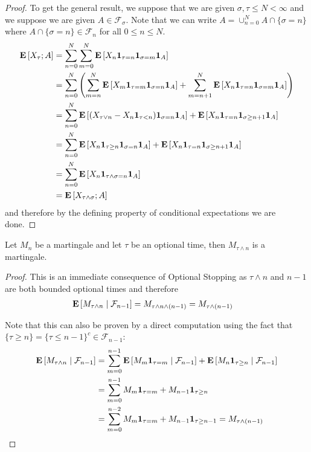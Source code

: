 \begin{proof}
To get the general result, we suppose that we are given $\sigma, \tau
\leq N < \infty$
and we suppose we are given $A \in \mathcal{F}_\sigma$.  Note that we
can write $A = \cup_{n=0}^N A \cap \lbrace \sigma=n\rbrace$ where
$A \cap \lbrace \sigma=n\rbrace \in \mathcal{F}_n$ for all $0 \leq n
\leq N$.
\begin{align*}
\expectation{X_\tau ; A} &= \sum_{n=0}^N \sum_{m=0}^N \expectation{X_n
  \characteristic{\tau=n} \characteristic{\sigma=m}
  \characteristic{A}} \\
&= \sum_{n=0}^N \left (
\sum_{m=n}^N \expectation{X_m
  \characteristic{\tau=m} \characteristic{\sigma=n} \characteristic{A}}+
\sum_{m=n+1}^N \expectation{X_n
  \characteristic{\tau=n} \characteristic{\sigma=m}\characteristic{A}}
\right) \\
&=\sum_{n=0}^N \expectation{(X_{\tau \vee n} - X_n
  \characteristic{\tau < n})\characteristic{\sigma=n}
  \characteristic{A}} + 
\expectation{X_n
  \characteristic{\tau=n} \characteristic{\sigma \geq
    n+1}\characteristic{A}} \\
&=\sum_{n=0}^N \expectation{X_n  \characteristic{\tau\geq n}\characteristic{\sigma=n}
  \characteristic{A}} + 
\expectation{X_n
  \characteristic{\tau=n} \characteristic{\sigma \geq
    n+1}\characteristic{A}} \\
&=\sum_{n=0}^N \expectation{X_n \characteristic{\tau \wedge \sigma =
    n}  \characteristic{A}} \\
&= \expectation{X_{\tau \wedge \sigma} ; A}
\end{align*}
and therefore by the defining property of conditional expectations we
are done.
\end{proof}

\begin{cor}Let $M_n$ be a martingale and let $\tau$ be an optional
  time, then $M_{\tau \wedge n}$ is a martingale.
\end{cor}
\begin{proof}
This is an immediate consequence of Optional Stopping as $\tau \wedge
n$ and $n-1$ are both bounded optional times and therefore 
\begin{align*}
\cexpectationlong{\mathcal{F}_{n-1}}{M_{\tau \wedge n}} &= M_{\tau
  \wedge n \wedge (n-1)} = M_{\tau \wedge (n-1)}
\end{align*}

Note that this can also be proven by a direct computation using the
fact that $\lbrace \tau \geq n \rbrace = \lbrace \tau \leq n-1
\rbrace^c \in \mathcal{F}_{n-1}$:
\begin{align*}
\cexpectationlong{\mathcal{F}_{n-1}}{M_{\tau \wedge n}} &=
\sum_{m=0}^{n-1} \cexpectationlong{\mathcal{F}_{n-1}}{M_m
  \characteristic{\tau=m}} + \cexpectationlong{\mathcal{F}_{n-1}}{M_n
\characteristic{\tau \geq n}} \\
&= \sum_{m=0}^{n-1} M_m  \characteristic{\tau=m} + M_{n-1}
\characteristic{\tau \geq n} \\
&= \sum_{m=0}^{n-2} M_m  \characteristic{\tau=m} + M_{n-1}
\characteristic{\tau \geq n-1} = M_{\tau \wedge (n-1)}\\
\end{align*}
\end{proof}

